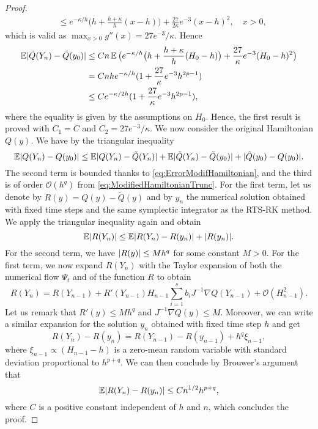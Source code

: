 \documentclass{siamart1116}
\numberwithin{theorem}{section}
\DeclarePairedDelimiter{\abs}{\lvert}{\rvert}
\newcommand{\OO}{\mathcal{O}}
\newcommand{\E}{\operatorname{\mathbb{E}}}
\begin{document}
\begin{proof}
\begin{equation}
\begin{aligned}
	&\leq e^{-\kappa/h} \big(h + \frac{h + \kappa}{h}(x-h)\big) + \frac{27}{2\kappa}e^{-3} (x-h)^2, \quad x > 0,
\end{aligned}
\end{equation}
which is valid as $\max_{x>0} g''(x) = 27e^{-3}/\kappa$. Hence
\begin{equation}\label{eq:ErrorModifHamiltonian}
\begin{aligned}
\E \abs{\tilde Q(Y_n) - \tilde Q(y_0)} &\leq Cn \E\big( e^{-\kappa/h} \big(h + \frac{h + \kappa}{h}(H_0-h)\big) + \frac{27}{\kappa}e^{-3} (H_0-h)^2 \big) \\
&= Cnhe^{-\kappa/h}(1 + \frac{27}{\kappa}e^{-3} h^{2p-1}) \\
&\leq Ce^{-\kappa/2h}(1 + \frac{27}{\kappa}e^{-3} h^{2p-1}),
\end{aligned}
\end{equation}
where the equality is given by the assumptions on $H_0$. Hence, the first result is proved with $C_1 = C$ and $C_2 = 27e^{-3}/\kappa$. We now consider the original Hamiltonian $Q(y)$. We have by the triangular inequality
\begin{equation}
	\E\abs{Q(Y_n) - Q(y_0)} \leq \E\abs{Q(Y_n) - \tilde Q(Y_n)} + \E\abs{\tilde Q(Y_n) - \tilde Q(y_0)} + \abs{\tilde Q(y_0) - Q(y_0)}.
\end{equation}
The second term is bounded thanks to \eqref{eq:ErrorModifHamiltonian}, and the third is of order $\OO(h^q)$ from \eqref{eq:ModifiedHamiltonianTrunc}. For the first term, let us denote by $R(y) = Q(y) - \tilde Q(y)$ and by $y_n$ the numerical solution obtained with fixed time steps and the same symplectic integrator as the RTS-RK method. We apply the triangular inequality again and obtain
\begin{equation}
	\E\abs{R(Y_n)} \leq \E\abs{R(Y_n) - R(y_n)} + \abs{R(y_n)}.
\end{equation}
For the second term, we have $\abs{R(y)} \leq Mh^q$ for some constant $M > 0$. For the first term, we now expand $R(Y_n)$ with the Taylor expansion of both the numerical flow $\Psi_t$ and of the function $R$ to obtain
\begin{equation}
	R(Y_n) = R(Y_{n-1}) + R'(Y_{n-1})H_{n-1}\sum_{i=1}^{s}b_i J^{-1}\nabla Q(Y_{n-1}) + \OO(H_{n-1}^2).
\end{equation} 
Let us remark that $R'(y) \leq M h^q$ and $J^{-1}\nabla Q(y) \leq M$. Moreover, we can write a similar expansion for the solution $y_n$ obtained with fixed time step $h$ and get
\begin{equation}
	R(Y_n) - R(y_n) = R(Y_{n-1}) - R(y_{n-1}) + h^q \xi_{n-1},
\end{equation}
where $\xi_{n-1} \propto (H_{n-1} - h)$ is a zero-mean random variable with standard deviation proportional to $h^{p+q}$. We can then conclude by Brouwer's argument that
\begin{equation}
	\E\abs{R(Y_n) - R(y_n)} \leq C n^{1/2} h^{p+q},
\end{equation}
where $C$ is a positive constant independent of $h$ and $n$, which concludes the proof.
\end{proof}
\end{document}
